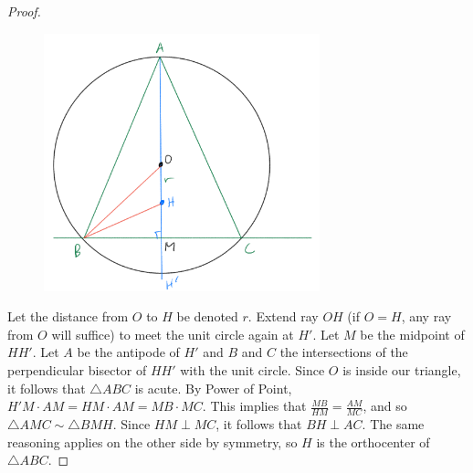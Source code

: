\documentclass[10pt]{../usamts}
\begin{document}
\begin{solution}
\begin{proof}
\begin{figure}
\centering
    \includegraphics[width=8cm]{round3/p5construct.jpeg}
\end{figure}
    Let the distance from $O$ to $H$ be denoted $r$. Extend ray $OH$ (if $O=H$, any ray from $O$ will suffice) to meet the unit circle again at $H'$. Let $M$ be the midpoint of $HH'$. Let $A$ be the antipode of $H'$ and $B$ and $C$ the intersections of the perpendicular bisector of $HH'$ with the unit circle. Since $O$ is inside our triangle, it follows that $\triangle ABC$ is acute. By Power of Point, $H'M \cdot AM = HM \cdot AM = MB \cdot MC$. This implies that $\frac{MB}{HM} = \frac{AM}{MC}$, and so $\triangle AMC \sim \triangle BMH$. Since $HM \perp MC$, it follows that $BH \perp AC$. The same reasoning applies on the other side by symmetry, so $H$ is the orthocenter of $\triangle ABC$.
\end{proof}

\end{solution}
\end{document}
